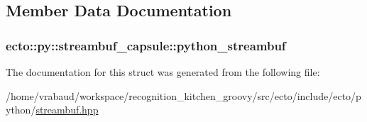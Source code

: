 \subsection{\-Member \-Data \-Documentation}
\hypertarget{structecto_1_1py_1_1streambuf__capsule_af18572e50f3cc158db18b7c0655ccd33}{
\subsubsection[{python\-\_\-streambuf}]{ {\bf ecto\-::py\-::streambuf\-\_\-capsule\-::python\-\_\-streambuf}}}\label{structecto_1_1py_1_1streambuf__capsule_af18572e50f3cc158db18b7c0655ccd33}


\-The documentation for this struct was generated from the following file\-:\begin{DoxyCompactItemize}
\item 
/home/vrabaud/workspace/recognition\-\_\-kitchen\-\_\-groovy/src/ecto/include/ecto/python/\hyperlink{streambuf_8hpp}{streambuf.\-hpp}\end{DoxyCompactItemize}

